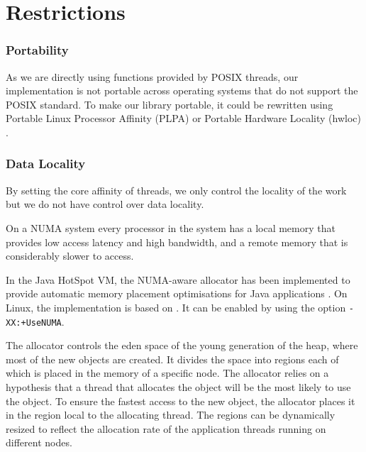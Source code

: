 


\section{Restrictions}
\label{sec:appendix-core-affinity-restrictions}

\subsubsection{Portability}

As we are directly using functions provided by POSIX threads, our
implementation is not portable across operating systems that do not
support the POSIX standard. To make our library portable, it could be
rewritten using Portable Linux Processor Affinity (PLPA)
\cite{OpenMPI2010a} or Portable Hardware Locality (hwloc)
\cite{OpenMPI2010}.

\subsubsection{Data Locality}

By setting the core affinity of threads, we only control the locality
of the work but we do not have control over data locality.

On a NUMA system every processor in the system has a local memory that
provides low access latency and high bandwidth, and a remote memory
that is considerably slower to access.

In the Java HotSpot VM, the NUMA-aware allocator has been implemented
to provide automatic memory placement optimisations for Java
applications \cite{Masamitsu2008, Oracle2010, Humble2010}. On Linux,
the implementation is based on \cite{Kleen2004}. It can be enabled by
using the option \verb!-XX:+UseNUMA!.

The allocator controls the eden space of the young generation of the
heap, where most of the new objects are created. It divides the space
into regions each of which is placed in the memory of a specific
node. The allocator relies on a hypothesis that a thread that
allocates the object will be the most likely to use the object. To
ensure the fastest access to the new object, the allocator places it
in the region local to the allocating thread. The regions can be
dynamically resized to reflect the allocation rate of the application
threads running on different nodes.

